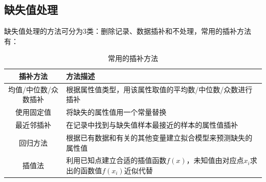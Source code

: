 \documentclass[openany]{progbookcn}
\begin{document}
\subsection{缺失值处理}
\indent 缺失值处理的方法可分为3类：删除记录、数据插补和不处理，常用的插补方法有：
\begin{table}[h]
\centering
\begin{tabular}{|c|l|}
\hline
{\bf 插补方法} & {\bf 方法描述}\\
\hline
均值/中位数/众数插补 & 根据属性值类型，用该属性取值的平均数/中位数/众数进行插补\\
\hline
使用固定值 & 将缺失的属性值用一个常量替换\\
\hline
最近邻插补 & 在记录中找到与缺失值样本最接近的样本的属性值插补\\
\hline
回归方法 & 根据已有数据和有关的其他变量建立拟合模型来预测缺失的属性值\\
\hline
插值法 & 利用已知点建立合适的插值函数$f(x)$，未知值由对应点$x_i$求出的函数值$f(x_i)$近似代替\\
\hline
\end{tabular}
\caption{常用的插补方法}
\end{table}\\
\end{document}
